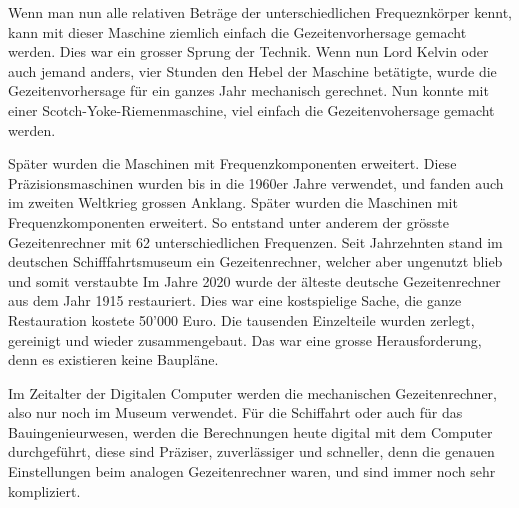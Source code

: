 Wenn man nun alle relativen Beträge der unterschiedlichen Frequeznkörper kennt, kann mit dieser Maschine ziemlich einfach die Gezeitenvorhersage gemacht werden.
Dies war ein grosser Sprung der Technik.
Wenn nun Lord Kelvin oder auch jemand anders, vier Stunden den Hebel der Maschine betätigte, wurde die Gezeitenvorhersage für ein ganzes Jahr mechanisch gerechnet.
Nun konnte mit einer Scotch-Yoke-Riemenmaschine, viel einfach die Gezeitenvohersage gemacht werden.

Später wurden die Maschinen mit Frequenzkomponenten erweitert.
Diese Präzisionsmaschinen wurden bis in die 1960er Jahre verwendet, und fanden auch im zweiten Weltkrieg grossen Anklang.
Später wurden die Maschinen mit Frequenzkomponenten erweitert.
So entstand unter anderem der grösste Gezeitenrechner mit 62 unterschiedlichen Frequenzen.
Seit Jahrzehnten stand im deutschen Schifffahrtsmuseum ein Gezeitenrechner, welcher aber ungenutzt blieb und somit verstaubte
Im Jahre 2020 wurde der älteste deutsche Gezeitenrechner aus dem Jahr 1915 restauriert.
Dies war eine kostspielige Sache, die ganze Restauration kostete 50'000 Euro.
Die tausenden Einzelteile wurden zerlegt, gereinigt und wieder zusammengebaut.
Das war eine grosse Herausforderung, denn es existieren keine Baupläne.

Im Zeitalter der Digitalen Computer werden die mechanischen Gezeitenrechner, also nur noch im Museum verwendet.
Für die Schiffahrt oder auch für das Bauingenieurwesen, werden die Berechnungen heute digital mit dem Computer durchgeführt, diese sind Präziser, zuverlässiger und schneller, denn die genauen Einstellungen beim analogen Gezeitenrechner waren, und sind immer noch sehr kompliziert.
